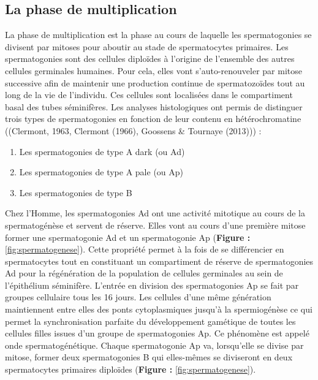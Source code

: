 \documentclass[12pt,twoside]{reedthesis}
\providecommand{\tightlist}{%
  \setlength{\itemsep}{0pt}\setlength{\parskip}{0pt}}
\theoremstyle{definition}
\theoremstyle{definition}
\theoremstyle{remark}
\begin{document}
  \subsection{La phase de
  multiplication}\label{la-phase-de-multiplication}
  
  La phase de multiplication est la phase au cours de laquelle les
  spermatogonies se divisent par mitoses pour aboutir au stade de
  spermatocytes primaires. Les spermatogonies sont des cellules diploïdes
  à l'origine de l'ensemble des autres cellules germinales humaines. Pour
  cela, elles vont s'auto-renouveler par mitose successive afin de
  maintenir une production continue de spermatozoïdes tout au long de la
  vie de l'individu. Ces cellules sont localisées dans le compartiment
  basal des tubes séminifères. Les analyses histologiques ont permis de
  distinguer trois types de spermatogonies en fonction de leur contenu en
  hétérochromatine ((Clermont, 1963, Clermont (1966), Goossens \& Tournaye
  (2013))) :
  
  \begin{enumerate}
  \def\labelenumi{\arabic{enumi}.}
  \tightlist
  \item
    Les spermatogonies de type A dark (ou Ad)\\
  \item
    Les spermatogonies de type A pale (ou Ap)\\
  \item
    Les spermatogonies de type B
  \end{enumerate}
  
  Chez l'Homme, les spermatogonies Ad ont une activité mitotique au cours
  de la spermatogénèse et servent de réserve. Elles vont au cours d'une
  première mitose former une spermatogonie Ad et un spermatogonie Ap
  (\textbf{Figure :} \ref{fig:spermatogenese}). Cette propriété permet à
  la fois de se différencier en spermatocytes tout en constituant un
  compartiment de réserve de spermatogonies Ad pour la régénération de la
  population de cellules germinales au sein de l'épithélium séminifère.
  L'entrée en division des spermatogonies Ap se fait par groupes
  cellulaire tous les 16 jours. Les cellules d'une même génération
  maintiennent entre elles des ponts cytoplasmiques jusqu'à la
  spermiogénèse ce qui permet la synchronisation parfaite du développement
  gamétique de toutes les cellules filles issues d'un groupe de
  spermatogonies Ap. Ce phénomène est appelé onde spermatogénétique.
  Chaque spermatogonie Ap va, lorsqu'elle se divise par mitose, former
  deux spermatogonies B qui elles-mêmes se diviseront en deux
  spermatocytes primaires diploïdes (\textbf{Figure :}
  \ref{fig:spermatogenese}).
  
\end{document}
